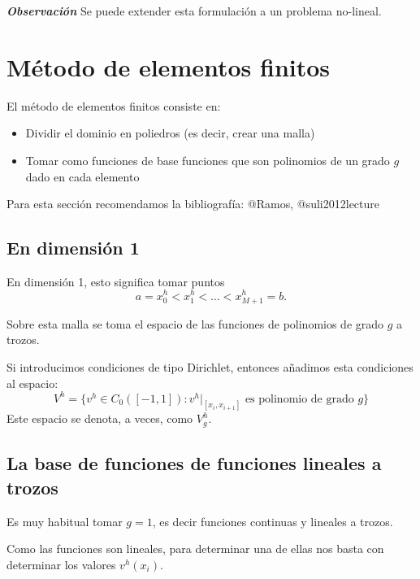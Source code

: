 \textbf{\emph{Observación}} Se puede extender esta formulación a un
problema no-lineal.

\section{Método de elementos
  finitos}\label{muxe9todo-de-elementos-finitos}

El método de elementos finitos consiste en:

\begin{itemize}
    \item
          Dividir el dominio en poliedros (es decir, crear una malla)
    \item
          Tomar como funciones de base funciones que son polinomios de un grado
          \(g\) dado en cada elemento
\end{itemize}



Para esta sección recomendamos la bibliografía: @Ramos, @suli2012lecture

\subsection{En dimensión 1}\label{en-dimensiuxf3n-1}

En dimensión 1, esto significa tomar puntos \[
    a = x_0^h < x_1^h < \dots < x_{M+1}^h = b.
\]



Sobre esta malla se toma el espacio de las funciones de polinomios de
grado \(g\) a trozos.



Si introducimos condiciones de tipo Dirichlet, entonces añadimos esta
condiciones al espacio: \[
    V^h = \{  v^h \in C_0 ([-1,1]) :  v^h|_{[x_i, x_{i+1}]} \text{ es polinomio de grado } g  \}
\] Este espacio se denota, a veces, como \(V_g^h\).

\subsection{La base de funciones de funciones lineales a
    trozos}\label{la-base-de-funciones-de-funciones-lineales-a-trozos}

Es muy habitual tomar \(g = 1\), es decir funciones continuas y lineales
a trozos.

Como las funciones son lineales, para determinar una de ellas nos basta
con determinar los valores \(v^h(x_i)\).



